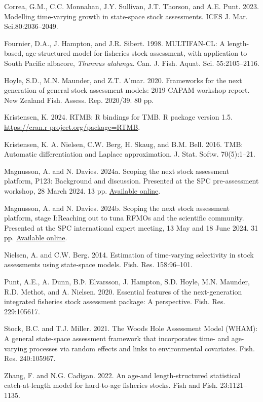 \documentclass{SCreport}
\begin{document}
\begin{description}\setlength\itemsep{0ex}
  \item Correa, G.M., C.C. Monnahan, J.Y. Sullivan, J.T. Thorson, and A.E. Punt.
  2023. Modelling time-varying growth in state-space stock assessments. ICES J.
  Mar. Sci.80:2036--2049.
  \item Fournier, D.A., J. Hampton, and J.R. Sibert. 1998. MULTIFAN-CL: A
  length-based, age-structured model for fisheries stock assessment, with
  application to South Pacific albacore, \textit{Thunnus alalunga}. Can. J.
  Fish. Aquat. Sci. 55:2105--2116.
  \item Hoyle, S.D., M.N. Maunder, and Z.T. A'mar. 2020. Frameworks for the next
  generation of general stock assessment models: 2019 CAPAM workshop report. New
  Zealand Fish. Assess. Rep. 2020/39. 80 pp.
  \item Kristensen, K. 2024. RTMB: R bindings for TMB. R package version 1.5.\\
  \href{https://cran.r-project.org/package=RTMB}{https://cran.r-project.org/package=RTMB}.
  \item Kristensen, K. A. Nielsen, C.W. Berg, H. Skaug, and B.M. Bell. 2016.
  TMB: Automatic differentiation and Laplace approximation. J. Stat. Softw.
  70(5):1--21.
  \item Magnusson, A. and N. Davies. 2024a. Scoping the next stock assessment
  platform, P123: Background and discussion. Presented at the SPC pre-assessment
  workshop, 28 March 2024. 13 pp.
  \href{https://github.com/PacificCommunity/ofp-sam-transition-plan/blob/main/presentations/2024_03_28_paw_scoping/2024_03_28_paw_scoping.pdf}
  {Available online}.
  \item Magnusson, A. and N. Davies. 2024b. Scoping the next stock assessment
  platform, stage I:\linebreak Reaching out to tuna RFMOs and the scientific
  community. Presented at the SPC international expert meeting, 13 May and 18
  June 2024. 31 pp.
  \href{https://github.com/PacificCommunity/ofp-sam-transition-plan/blob/main/presentations/2024_05_13_experts_scoping/2024_05_13_experts_scoping.pdf}
  {Available online}.
  \item Nielsen, A. and C.W. Berg. 2014. Estimation of time-varying selectivity
  in stock assessments using state-space models. Fish. Res. 158:96--101.
  \item Punt, A.E., A. Dunn, B.Þ. Elvarsson, J. Hampton, S.D. Hoyle, M.N.
  Maunder, R.D. Methot, and A. Nielsen. 2020. Essential features of the
  next-generation integrated fisheries stock assessment package: A perspective.
  Fish. Res. 229:105617.
  \item Stock, B.C. and T.J. Miller. 2021. The Woods Hole Assessment Model
  (WHAM): A general state-space assessment framework that incorporates time- and
  age-varying processes via random effects and links to environmental
  covariates. Fish. Res. 240:105967.
  \item Zhang, F. and N.G. Cadigan. 2022. An age-and length-structured
  statistical catch-at-length model for hard-to-age fisheries stocks. Fish and
  Fish. 23:1121--1135.
\end{description}
\end{document}
